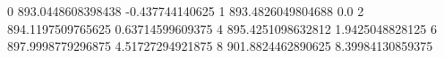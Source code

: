 0 893.0448608398438 -0.437744140625
1 893.4826049804688 0.0
2 894.1197509765625 0.63714599609375
4 895.4251098632812 1.9425048828125
6 897.9998779296875 4.51727294921875
8 901.8824462890625 8.39984130859375
